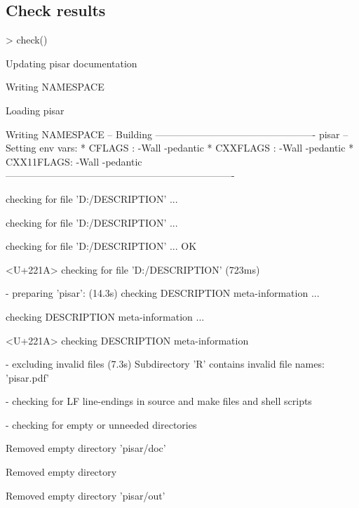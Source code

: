 \documentclass[a4paper,12pt]{article}\usepackage[]{graphicx}\usepackage[]{color}
\begin{document}
\subsection{Check results}
\begin{Schunk}
\begin{Sinput}
> check()
\end{Sinput}
\begin{Soutput}
Updating pisar documentation
\end{Soutput}
\begin{Soutput}
Writing NAMESPACE
\end{Soutput}
\begin{Soutput}
Loading pisar
\end{Soutput}
\begin{Soutput}
Writing NAMESPACE
-- Building ------------------------------------------------- pisar --
Setting env vars:
* CFLAGS    : -Wall -pedantic
* CXXFLAGS  : -Wall -pedantic
* CXX11FLAGS: -Wall -pedantic
----------------------------------------------------------------------
  
  
  
   checking for file 'D:\OMIKE\pisar/DESCRIPTION' ...
  
   checking for file 'D:\OMIKE\pisar/DESCRIPTION' ... 
  
   checking for file 'D:\OMIKE\pisar/DESCRIPTION' ... OK
  
<U+221A>  checking for file 'D:\OMIKE\pisar/DESCRIPTION' (723ms)

  
  
  
-  preparing 'pisar': (14.3s)
   checking DESCRIPTION meta-information ...
  
   checking DESCRIPTION meta-information ... 
  
<U+221A>  checking DESCRIPTION meta-information

  
  
  
-  excluding invalid files (7.3s)
   Subdirectory 'R' contains invalid file names:
     'pisar.pdf'

  
  
  
-  checking for LF line-endings in source and make files and shell scripts

  
  
  
-  checking for empty or unneeded directories

  
   Removed empty directory 'pisar/doc'

  
Removed empty directory 
  
   Removed empty directory 'pisar/out'


\end{Soutput}
\end{Schunk}
\end{document}
